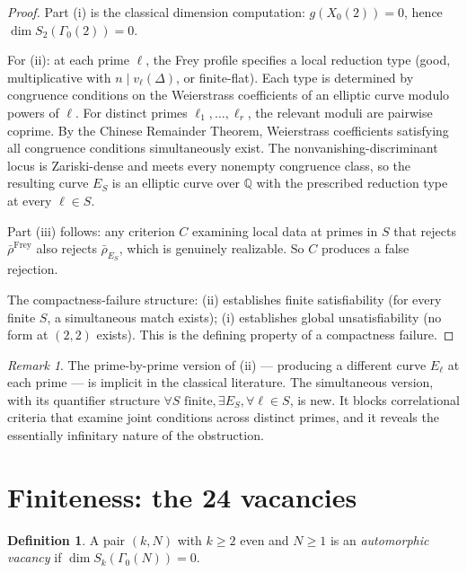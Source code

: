 \documentclass[12pt]{amsart}
\theoremstyle{definition}
\newtheorem{definition}[theorem]{Definition}
\theoremstyle{remark}
\newtheorem{remark}[theorem]{Remark}
\newcommand{\rhobar}{\bar{\rho}}
\begin{document}
\begin{proof}
Part (i) is the classical dimension computation: $g(X_0(2)) = 0$, hence $\dim S_2(\Gamma_0(2)) = 0$.

For (ii): at each prime $\ell$, the Frey profile specifies a local reduction type (good, multiplicative with $n \mid v_\ell(\Delta)$, or finite-flat). Each type is determined by congruence conditions on the Weierstrass coefficients of an elliptic curve modulo powers of $\ell$. For distinct primes $\ell_1, \ldots, \ell_r$, the relevant moduli are pairwise coprime. By the Chinese Remainder Theorem, Weierstrass coefficients satisfying all congruence conditions simultaneously exist. The nonvanishing-discriminant locus is Zariski-dense and meets every nonempty congruence class, so the resulting curve $E_S$ is an elliptic curve over $\mathbb{Q}$ with the prescribed reduction type at every $\ell \in S$.

Part (iii) follows: any criterion $C$ examining local data at primes in $S$ that rejects $\rhobar^{\mathrm{Frey}}$ also rejects $\rhobar_{E_S}$, which is genuinely realizable. So $C$ produces a false rejection.

The compactness-failure structure: (ii) establishes finite satisfiability (for every finite $S$, a simultaneous match exists); (i) establishes global unsatisfiability (no form at $(2,2)$ exists). This is the defining property of a compactness failure.
\end{proof}

\begin{remark}
The prime-by-prime version of (ii) --- producing a different curve $E_\ell$ at each prime --- is implicit in the classical literature. The simultaneous version, with its quantifier structure $\forall S \text{ finite}, \exists E_S, \forall \ell \in S$, is new. It blocks correlational criteria that examine joint conditions across distinct primes, and it reveals the essentially infinitary nature of the obstruction.
\end{remark}

\section{Finiteness: the 24 vacancies}
\label{sec:finiteness}

\begin{definition}
A pair $(k, N)$ with $k \geq 2$ even and $N \geq 1$ is an \emph{automorphic vacancy} if $\dim S_k(\Gamma_0(N)) = 0$.
\end{definition}
\end{document}
